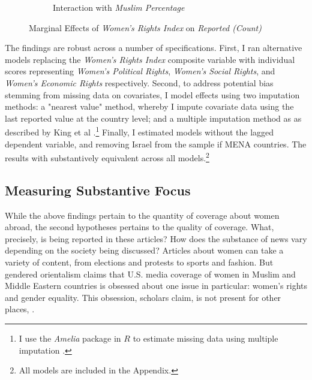 \documentclass[11pt, oneside]{article}
\begin{document}
\begin{figure}
\begin{subfigure}{.5\textwidth}
    \caption{Interaction with \emph{Muslim Percentage}}
  \label{fig:sfig2}
\end{subfigure}
\vspace{.5cm}
\caption{Marginal Effects of \emph{Women's Rights Index} on \emph{Reported (Count)}}
\label{fig:interactions}
\end{figure}

The findings are robust across a number of specifications. First, I ran alternative models replacing the \emph{Women's Rights Index} composite variable with individual scores representing \emph{Women's Political Rights}, \emph{Women's Social Rights}, and \emph{Women's Economic Rights} respectively. Second, to address potential bias stemming from missing data on covariates, I model effects using two imputation methods: a "nearest value" method, whereby I impute covariate data using the last reported value at the country level; and a multiple imputation method as as described by King et al \citeyear{king2001}.\footnote{\hspace{5} I use the \emph{Amelia} package in $R$ to estimate missing data using multiple imputation \cite{honaker2011}.} Finally, I estimated models without the lagged dependent variable, and removing Israel from the sample if MENA countries. The results with substantively equivalent across all models.\footnote{\hspace{5}All models are included in the Appendix.}

\subsection{Measuring Substantive Focus}

While the above findings pertain to the quantity of coverage about women abroad, the second hypotheses pertains to the quality of coverage. What, precisely, is being reported in these articles? How does the substance of news vary depending on the society being discussed? Articles about women can take a variety of content, from elections and protests to sports and fashion. But gendered orientalism claims that U.S. media coverage of women in Muslim and Middle Eastern countries is obsessed about one issue in particular: women's rights and gender equality. This obsession, scholars claim, is not present for other places, . 
\end{document}
